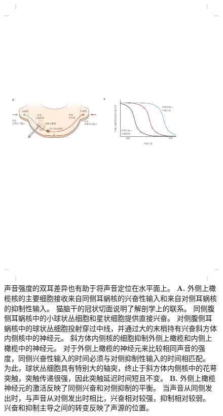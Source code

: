 \begin{figure}[htbp]
	\centering
	\includegraphics[width=1.0\linewidth]{chap28/fig_28_6}
	\caption{声音强度的双耳差异也有助于将声音定位在水平面上。
		\textbf{A.} 外侧上橄榄核的主要细胞接收来自同侧耳蜗核的兴奋性输入和来自对侧耳蜗核的抑制性输入。
		猫脑干的冠状切面说明了解剖学上的联系。
		同侧腹侧耳蜗核中的小球状丛细胞和星状细胞提供直接兴奋。 
		对侧腹侧耳蜗核中的球状丛细胞投射穿过中线，并通过大的末梢持有兴奋斜方体内侧核中的神经元。
		斜方体内侧核的细胞抑制外侧上橄榄和内侧上橄榄中的神经元。
		对于外侧上橄榄的神经元来比较相同声音的强度，同侧兴奋性输入的时间必须与对侧抑制性输入的时间相匹配。
		为此，球状丛细胞具有特别大的轴突，终止于斜方体内侧核中的花萼突触，突触传递很强，因此突触延迟时间短且不变。
		\textbf{B.} 外侧上橄榄神经元的激活反映了同侧兴奋和对侧抑制的平衡。
		当声音从同侧发出时，与声音从对侧发出时相比，兴奋相对较强，抑制相对较弱。
		兴奋和抑制主导之间的转变反映了声源的位置。}
	\label{fig:28_6}
\end{figure}


